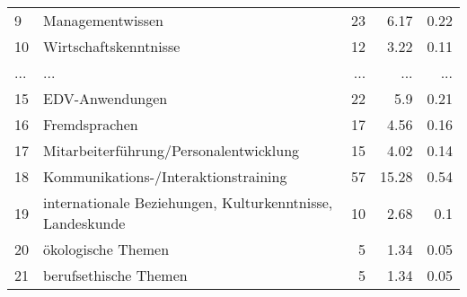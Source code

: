 \begin{longtable}{lXrrr}
        9 & \multicolumn{1}{X}{Managementwissen} & %
          \num{23} &
          \num[round-mode=places,round-precision=2]{6,17} &
          \num[round-mode=places,round-precision=2]{0,22} \\
        10 & \multicolumn{1}{X}{Wirtschaftskenntnisse} & %
          \num{12} &
          \num[round-mode=places,round-precision=2]{3,22} &
          \num[round-mode=places,round-precision=2]{0,11} \\
       ... & ... & ... & ... & ... \\
        15 & \multicolumn{1}{X}{EDV-Anwendungen} & %
          \num{22} &
          \num[round-mode=places,round-precision=2]{5,9} &
          \num[round-mode=places,round-precision=2]{0,21} \\

        16 & \multicolumn{1}{X}{Fremdsprachen} & %
          \num{17} &
          \num[round-mode=places,round-precision=2]{4,56} &
          \num[round-mode=places,round-precision=2]{0,16} \\

        17 & \multicolumn{1}{X}{Mitarbeiterführung/Personalentwicklung} & %
          \num{15} &
          \num[round-mode=places,round-precision=2]{4,02} &
          \num[round-mode=places,round-precision=2]{0,14} \\

        18 & \multicolumn{1}{X}{Kommunikations-/Interaktionstraining} & %
          \num{57} &
          \num[round-mode=places,round-precision=2]{15,28} &
          \num[round-mode=places,round-precision=2]{0,54} \\

        19 & \multicolumn{1}{X}{internationale Beziehungen, Kulturkenntnisse, Landeskunde} & %
          \num{10} &
          \num[round-mode=places,round-precision=2]{2,68} &
          \num[round-mode=places,round-precision=2]{0,1} \\

        20 & \multicolumn{1}{X}{ökologische Themen} & %
          \num{5} &
          \num[round-mode=places,round-precision=2]{1,34} &
          \num[round-mode=places,round-precision=2]{0,05} \\

        21 & \multicolumn{1}{X}{berufsethische Themen} & %
          \num{5} &
          \num[round-mode=places,round-precision=2]{1,34} &
          \num[round-mode=places,round-precision=2]{0,05} \\


\end{longtable}

